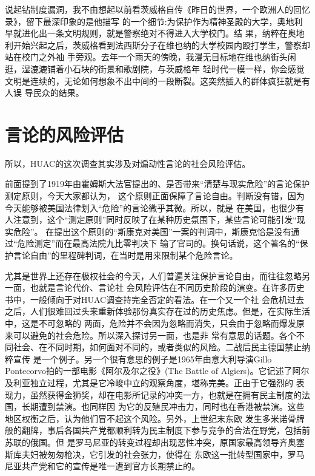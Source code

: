 \documentclass[10pt]{article}
\begin{document}
{说起钻制度漏洞，我不由想起以前看茨威格自传《昨日的世界，一个欧洲人的回忆录》，留下最深印象的是他描写
的一个细节:为保护作为精神圣殿的大学，奥地利早就进化出一条文明规则，就是警察绝对不得进入大学校门。结
果，纳粹在奥地利开始兴起之后，茨威格看到法西斯分子在维也纳的大学校园内殴打学生，警察却站在校门之外袖
手旁观。去年一个雨天的傍晚，我漫无目标地在维也纳街头闲逛，湿漉漉铺着小石块的街景和歌剧院，与茨威格年
轻时代一模一样，你会感觉文明是连续的，无论如何想象不出中间的一段断裂。这突然插入的群体疯狂就是有人误
导民众的结果。

\pagebreak
\section{言论的风险评估}

所以，HUAC的这次调查其实涉及对煽动性言论的社会风险评估。

前面提到了1919年由霍姆斯大法官提出的、是否带来``清楚与现实危险''的言论保护测定原则，今天大家都认为，
这个原则正面保障了言论自由。判断没有错，因为今天能够被美国法律划入``危险''的言论微乎其微。所以，就是
在美国，也很少有人注意到，这个``测定原则''同时反映了在某种历史氛围下，某些言论可能引发``现实危险''。
在提出这个原则的``斯康克对美国''一案的判词中，斯康克恰是没有通过``危险测定''而在最高法院九比零判决下
输了官司的。换句话说，这个著名的``保护言论自由''的里程碑判词，在当时是用来限制某个危险言论。

尤其是世界上还存在极权社会的今天，人们普遍关注保护言论自由，而往往忽略另一面，也就是言论代价、言论社
会风险评估在不同历史阶段的演变。在许多历史书中，一般倾向于对HUAC调查持完全否定的看法。在一个又一个社
会危机过去之后，人们很难回过头来重新体验那份真实存在过的历史焦虑。但是，在实际生活中，这是不可忽略的
两面，危险并不会因为忽略而消失，只会由于忽略而爆发原来可以避免的社会危险。所以深入探讨另一面，也是非
常有意思的话题。各个不同社会、在不同时期，如何面对不同的，或者类似的风险。二战后民主德国禁止纳粹宣传
是一个例子。另一个很有意思的例子是1965年由意大利导演Gillo Pontecorvo拍的一部电影《阿尔及尔之役》(The
Battle of Algiers)。它记述了阿尔及利亚独立过程，尤其是它冷峻中立的观察角度，堪称完美。正由于它强烈的
表现力，虽然获得金狮奖，却在电影所记录的冲突一方，也就是在拥有民主制度的法国，长期遭到禁演。也同样因
为它的反殖民冲击力，同时也在香港被禁演。这些地区权衡之后，认为他们冒不起这个风险。另外，上世纪末东欧
发生多米诺骨牌般的翻牌，事后各国共产党都顺利转为民主制度下参与竞争的合法在野党，包括前苏联的俄国。但
是罗马尼亚的转变过程却出现恶性冲突，原国家最高领导齐奥塞斯库夫妇被匆匆枪决，它引发的社会张力，使得在
东欧这一批转型国家中，罗马尼亚共产党和它的宣传是唯一遭到官方长期禁止的。

}
\end{document}
